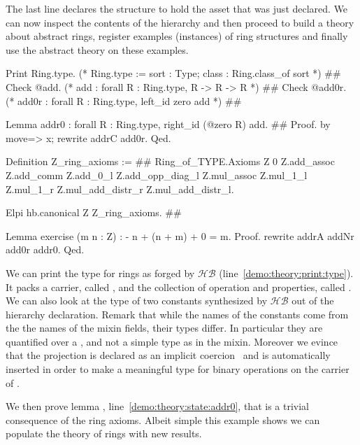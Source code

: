 \documentclass[a4paper,UKenglish,cleveref, autoref]{lipics-v2019}
\newcommand{\HB}{\ensuremath{\mathcal{HB}}}
\begin{document}
The last line declares the structure  to hold the asset that
was just declared. We can now inspect the contents of the hierarchy and then
proceed to build a theory about abstract rings,
register examples (instances) of ring structures
and finally use the abstract theory on these examples.

\begin{coqcode}
Print Ring.type. (* Ring.type  :=  { sort : Type;  class : Ring.class_of sort } *) #\label{demo:theory:print:type}#
Check @add.      (* add        :   forall R : Ring.type, R -> R -> R            *) #\label{demo:theory:check:zero}#
Check @add0r.    (* add0r      :   forall R : Ring.type, left_id zero add       *) #\label{demo:theory:check:add0r}#

Lemma addr0 : forall R : Ring.type, right_id (@zero R) add. #\label{demo:theory:state:addr0}#
Proof. by move=> x; rewrite addrC add0r. Qed.

Definition Z_ring_axioms :=                               #\label{demo:theory:zaxioms}#
  Ring_of_TYPE.Axioms Z 0%
    Z.add_assoc Z.add_comm Z.add_0_l Z.add_opp_diag_l
    Z.mul_assoc Z.mul_1_l Z.mul_1_r
    Z.mul_add_distr_r Z.mul_add_distr_l.

Elpi hb.canonical Z Z_ring_axioms.                        #\label{demo:theory:zaxioms:canonical}#

Lemma exercise (m n : Z) : - n + (n + m) + 0 = m.
Proof. rewrite addrA addNr add0r addr0. Qed.
\end{coqcode}

We can print the type for rings as forged by \HB{} (line~\ref{demo:theory:print:type}).
It packs a carrier, called , and the collection of operation and
properties, called .  We can also look at the type of two
constants synthesized by \HB{} out of the hierarchy declaration. Remark that
while the names of the constants come from the the names of the mixin fields,
their types differ.
In particular they are quantified over a , and not
a simple type as in the mixin. Moreover we evince that
the  projection is declared as an implicit coercion~\cite{Saibi97} and is automatically
inserted in order to make  a meaningful type for binary
operations on the carrier of .

We then prove lemma , line~\ref{demo:theory:state:addr0}, that is
a trivial consequence of the ring axioms. Albeit simple this example shows
we can populate the theory of rings with new results.
\end{document}
